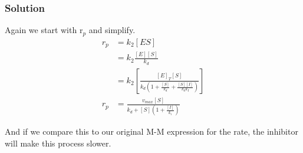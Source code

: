 \documentclass{article}
\newcommand{\be}{\begin{equation}}
\newcommand{\ee}{\end{equation}}
\begin{document}
\subsubsection*{Solution}
Again we start with r$_p$ and simplify.
\be
\begin{split}
r_p &= k_2[ES] \\
&= k_2\frac{[E][S]}{k_d}\\
&= k_2\left[\frac{[E]_T[S]}{k_d \left(1+\frac{[S]}{k_d} + \frac{[S][I]}{k_dk_I}\right)}\right]\\
r_p &= \frac{v_{max}[S]}{k_d + [S]\left(1+\frac{[I]}{k_i}\right)}
\end{split}
\ee

And if we compare this to our original M-M expression for the rate, the inhibitor will make this process slower.
\end{document}
